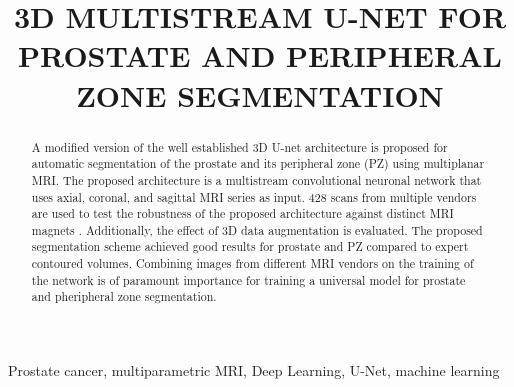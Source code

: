 \documentclass{article}
\title{3D MULTISTREAM U-NET FOR PROSTATE AND PERIPHERAL ZONE SEGMENTATION}
\begin{document}
\maketitle

\begin{abstract}
A modified version of the well established 3D U-net architecture is proposed
for automatic segmentation of the prostate and its peripheral zone (PZ) using
multiplanar MRI. The proposed architecture is a multistream convolutional
neuronal network that uses axial, coronal, and sagittal MRI series as input. 
428 scans from multiple vendors are used to test the robustness 
of the proposed architecture against distinct MRI magnets . Additionally, the 
effect of 3D data augmentation  is evaluated.
The proposed segmentation scheme achieved good results for prostate and PZ compared to expert
contoured volumes. Combining images from different MRI vendors on the training of 
the network is of paramount importance for training a universal model for
prostate and pheripheral zone segmentation. 
\end{abstract}

\begin{keywords}
Prostate cancer, multiparametric MRI, Deep Learning, U-Net, machine learning
\end{keywords}








\end{document}

